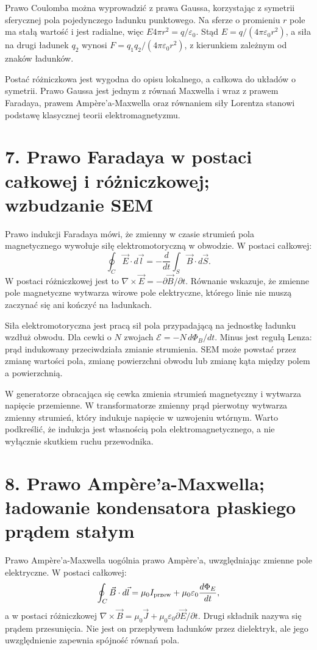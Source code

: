 \documentclass[11pt,a4paper,oneside]{report}
\begin{document}
Prawo Coulomba można wyprowadzić z prawa Gaussa, korzystając z symetrii sferycznej pola pojedynczego ładunku punktowego. Na sferze o promieniu \(r\) pole ma stałą wartość i jest radialne, więc \(E4\pi r^2=q/\varepsilon_0\). Stąd \(E=q/(4\pi\varepsilon_0r^2)\), a siła na drugi ładunek \(q_2\) wynosi \(F=q_1q_2/(4\pi\varepsilon_0r^2)\), z kierunkiem zależnym od znaków ładunków.

Postać różniczkowa jest wygodna do opisu lokalnego, a całkowa do układów o symetrii. Prawo Gaussa jest jednym z równań Maxwella i wraz z prawem Faradaya, prawem Ampère’a-Maxwella oraz równaniem siły Lorentza stanowi podstawę klasycznej teorii elektromagnetyzmu.

\section{7. Prawo Faradaya w postaci całkowej i różniczkowej; wzbudzanie SEM}
Prawo indukcji Faradaya mówi, że zmienny w czasie strumień pola magnetycznego wywołuje siłę elektromotoryczną w obwodzie. W postaci całkowej:
\[
\oint_C\vec E\cdot d\vec l=-\frac{d}{dt}\int_S\vec B\cdot d\vec S.
\]
W postaci różniczkowej jest to \(\nabla\times\vec E=-\partial\vec B/\partial t\). Równanie wskazuje, że zmienne pole magnetyczne wytwarza wirowe pole elektryczne, którego linie nie muszą zaczynać się ani kończyć na ładunkach.

Siła elektromotoryczna jest pracą sił pola przypadającą na jednostkę ładunku wzdłuż obwodu. Dla cewki o \(N\) zwojach \(\mathcal E=-N\,d\Phi_B/dt\). Minus jest regułą Lenza: prąd indukowany przeciwdziała zmianie strumienia. SEM może powstać przez zmianę wartości pola, zmianę powierzchni obwodu lub zmianę kąta między polem a powierzchnią.

W generatorze obracająca się cewka zmienia strumień magnetyczny i wytwarza napięcie przemienne. W transformatorze zmienny prąd pierwotny wytwarza zmienny strumień, który indukuje napięcie w uzwojeniu wtórnym. Warto podkreślić, że indukcja jest własnością pola elektromagnetycznego, a nie wyłącznie skutkiem ruchu przewodnika.

\section{8. Prawo Ampère’a-Maxwella; ładowanie kondensatora płaskiego prądem stałym}
Prawo Ampère’a-Maxwella uogólnia prawo Ampère’a, uwzględniając zmienne pole elektryczne. W postaci całkowej:
\[
\oint_C\vec B\cdot d\vec l=\mu_0 I_{\rm przew}+\mu_0\varepsilon_0\frac{d\Phi_E}{dt},
\]
a w postaci różniczkowej \(\nabla\times\vec B=\mu_0\vec J+\mu_0\varepsilon_0\partial\vec E/\partial t\). Drugi składnik nazywa się prądem przesunięcia. Nie jest on przepływem ładunków przez dielektryk, ale jego uwzględnienie zapewnia spójność równań pola.
\end{document}
